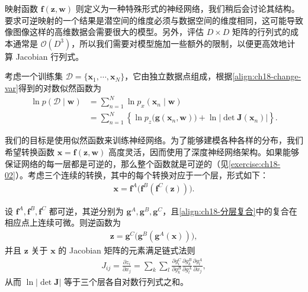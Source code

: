 \documentclass[../main.tex]{subfiles}
\begin{document}
映射函数 $\bm{f}(\bm{z},\bm{w})$ 则定义为一种特殊形式的神经网络，我们稍后会讨论其结构。要求可逆映射的一个结果是潜空间的维度必须与数据空间的维度相同，这可能导致像图像这样的高维数据会需要很大的模型。另外，评估 $D\times D$ 矩阵的行列式的成本通常是 $\mathcal{O}(D^{3})$，所以我们需要对模型施加一些额外的限制，以便更高效地计算 Jacobian 行列式。

考虑一个训练集 $\mathcal{D}=\{\bm{x}_1,\cdots,\bm{x}_N\}$，它由独立数据点组成，根据\eqref{align:ch18-change-var}得到的对数似然函数为
\begin{align}
  \ln p(\mathcal{D}\mid\bm{w})&=\sum_{n=1}^{N}\ln p_x(\bm{x}_n\mid\bm{w})\label{align:ch18-对数似然}\\
  &=\sum_{n=1}^{N}\left\{\ln p_z\big(\bm{g}(\bm{x}_n,\bm{w})\big)+\ln\left|\det\bm{J}(\bm{x}_n)\right|\right\}.\label{align:ch18-对数似然展开}
\end{align}

我们的目标是使用似然函数来训练神经网络。为了能够建模各种各样的分布，我们希望转换函数 $\bm{x}=\bm{f}(\bm{z},\bm{w})$ 高度灵活，因而使用了深度神经网络架构。如果能够保证网络的每一层都是可逆的，那么整个函数就是可逆的（见\cref{exercise:ch18-02}）。考虑三个连续的转换，其中的每个转换对应于一个层，形式如下：
\begin{align}
  \bm{x}=\bm{f}^{A}\big(\bm{f}^{B}(\bm{f}^{C}(\bm{z}))\big).\label{align:ch18-分层复合}
\end{align}

\begin{proposition}\label{proposition:ch18-分层流}
设 $\bm{f}^{A},\bm{f}^{B},\bm{f}^{C}$ 都可逆，其逆分别为 $\bm{g}^{A},\bm{g}^{B},\bm{g}^{C}$，且\eqref{align:ch18-分层复合}中的复合在相应点上连续可微。则逆函数为
\begin{align}
  \bm{z}=\bm{g}^{C}\big(\bm{g}^{B}(\bm{g}^{A}(\bm{x}))\big),\label{align:ch18-分层逆}
\end{align}
并且 $\bm{z}$ 关于 $\bm{x}$ 的 Jacobian 矩阵的元素满足链式法则
\begin{align}
  J_{ij}=\frac{\partial z_i}{\partial x_j}=\sum_{k}\sum_{l}\frac{\partial g_i^{C}}{\partial g_k^{B}}\frac{\partial g_k^{B}}{\partial g_l^{A}}\frac{\partial g_l^{A}}{\partial x_j},\label{align:ch18-分层Jacobian}
\end{align}
从而 $\ln\left|\det\bm{J}\right|$ 等于三个层各自对数行列式之和。
\end{proposition}
\end{document}

